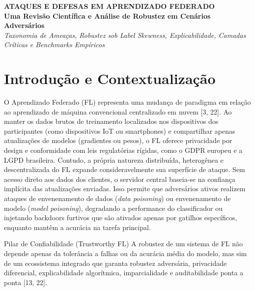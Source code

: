 \documentclass[11pt,a4paper]{article}
\begin{document}
\begin{center}
    \vspace*{10pt}
    {\color{primary}\fontsize{20}{24}\selectfont\textbf{ATAQUES E DEFESAS EM APRENDIZADO FEDERADO}} \\[8pt]
    {\color{secondary}\fontsize{13}{16}\selectfont\textbf{Uma Revisão Científica e Análise de Robustez em Cenários Adversários}} \\[12pt]
    {\color{gray}\fontsize{9}{11}\selectfont\textit{Taxonomia de Ameaças, Robustez sob Label Skewness, Explicabilidade, Camadas Críticas e Benchmarks Empíricos}} \\[8pt]
    \noindent\makebox[\linewidth]{\color{secondary!50}\rule{\textwidth}{1.2pt}}
    \vspace*{10pt}
\end{center}

\section*{Introdução e Contextualização}
O Aprendizado Federado (FL) representa uma mudança de paradigma em relação ao aprendizado de máquina convencional centralizado em nuvem [3, 22]. Ao manter os dados brutos de treinamento localizados nos dispositivos dos participantes (como dispositivos IoT ou smartphones) e compartilhar apenas atualizações de modelos (gradientes ou pesos), o FL oferece privacidade por design e conformidade com leis regulatórias rígidas, como o GDPR europeu e a LGPD brasileira. Contudo, a própria natureza distribuída, heterogênea e descentralizada do FL expande consideravelmente sua superfície de ataque. Sem acesso direto aos dados dos clientes, o servidor central baseia-se na confiança implícita das atualizações enviadas. Isso permite que adversários ativos realizem ataques de envenenamento de dados (\textit{data poisoning}) ou envenenamento de modelo (\textit{model poisoning}), degradando a performance do classificador ou injetando backdoors furtivos que são ativados apenas por gatilhos específicos, enquanto mantêm a acurácia na tarefa principal.

\begin{calloutbox}{Pilar de Confiabilidade (Trustworthy FL)}
A robustez de um sistema de FL não depende apenas da tolerância a falhas ou da acurácia média do modelo, mas sim de um ecossistema integrado que garanta robustez adversária, privacidade diferencial, explicabilidade algorítmica, imparcialidade e auditabilidade ponta a ponta [13, 22].
\end{calloutbox}
\end{document}
